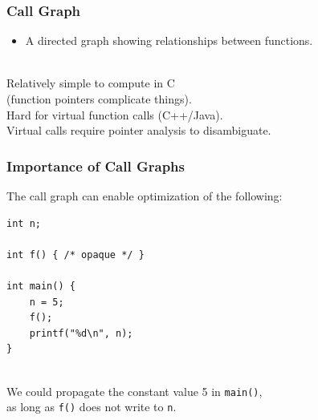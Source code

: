 \begin{frame}
  \frametitle{Call Graph}
  
  
\begin{itemize}
\item     A directed graph showing relationships between functions.
\end{itemize}
~\\
     Relatively simple to compute in C\\\qquad (function pointers complicate things).\\

     Hard for virtual function calls (C++/Java).\\[1em]

     Virtual calls require pointer analysis to disambiguate.
  
\end{frame}

\begin{frame}[fragile]
  \frametitle{Importance of Call Graphs}

  

  The call graph can enable optimization of the following:

  \begin{lstlisting}
int n;

int f() { /* opaque */ }

int main() {
    n = 5;
    f();
    printf("%d\n", n);
}
  \end{lstlisting}
~\\
  We could propagate the constant value 5 in {\tt main()},\\ \qquad as long as {\tt f()}
  does not write to {\tt n}.
  
\end{frame}

